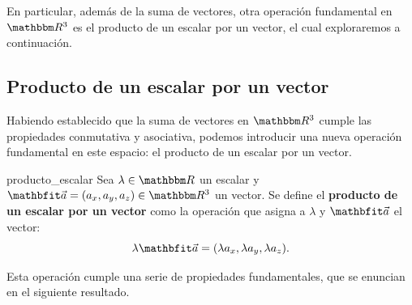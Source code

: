 En particular, además de la suma de vectores, otra operación fundamental en $\RR[3]$ es el producto de un escalar por un vector, el cual exploraremos a continuación.

\subsection{Producto de un escalar por un vector}

Habiendo establecido que la suma de vectores en $\RR[3]$ cumple las propiedades conmutativa y asociativa, podemos introducir una nueva operación fundamental en este espacio: el producto de un escalar por un vector.

\begin{definition}{}{producto_escalar}
    Sea $\lambda \in \RR$ un escalar y $\veca = (a_x, a_y, a_z) \in \RR[3]$ un vector. Se define el \textbf{producto de un escalar por un vector} como la operación que asigna a $\lambda$ y $\veca$ el vector:
    $$\lambda \veca = (\lambda a_x, \lambda a_y, \lambda a_z).$$
\end{definition}

Esta operación cumple una serie de propiedades fundamentales, que se enuncian en el siguiente resultado.

